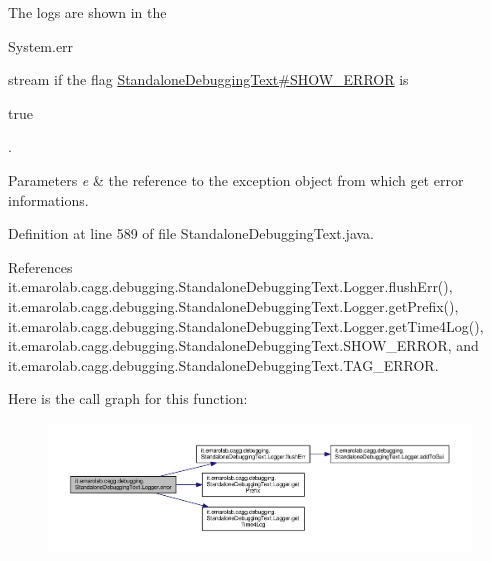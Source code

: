  The logs are shown in the
\begin{DoxyCode}
System.err 
\end{DoxyCode}
 stream if the flag \hyperlink{classit_1_1emarolab_1_1cagg_1_1debugging_1_1StandaloneDebuggingText_a25b2f13f846a13ea2f8ec233645cec10}{Standalone\-Debugging\-Text\#\-S\-H\-O\-W\-\_\-\-E\-R\-R\-O\-R} is
\begin{DoxyCode}
\textcolor{keyword}{true} 
\end{DoxyCode}
 . 
\begin{DoxyParams}{Parameters}
{\em e} & the reference to the exception object from which get error informations. \\
\hline
\end{DoxyParams}


Definition at line 589 of file Standalone\-Debugging\-Text.\-java.



References it.\-emarolab.\-cagg.\-debugging.\-Standalone\-Debugging\-Text.\-Logger.\-flush\-Err(), it.\-emarolab.\-cagg.\-debugging.\-Standalone\-Debugging\-Text.\-Logger.\-get\-Prefix(), it.\-emarolab.\-cagg.\-debugging.\-Standalone\-Debugging\-Text.\-Logger.\-get\-Time4\-Log(), it.\-emarolab.\-cagg.\-debugging.\-Standalone\-Debugging\-Text.\-S\-H\-O\-W\-\_\-\-E\-R\-R\-O\-R, and it.\-emarolab.\-cagg.\-debugging.\-Standalone\-Debugging\-Text.\-T\-A\-G\-\_\-\-E\-R\-R\-O\-R.



Here is the call graph for this function\-:
\nopagebreak
\begin{figure}[H]
\begin{center}
\leavevmode
\includegraphics[width=350pt]{classit_1_1emarolab_1_1cagg_1_1debugging_1_1StandaloneDebuggingText_1_1Logger_a55bf560286cdf68a485422490f2d4fba_cgraph}
\end{center}
\end{figure}


